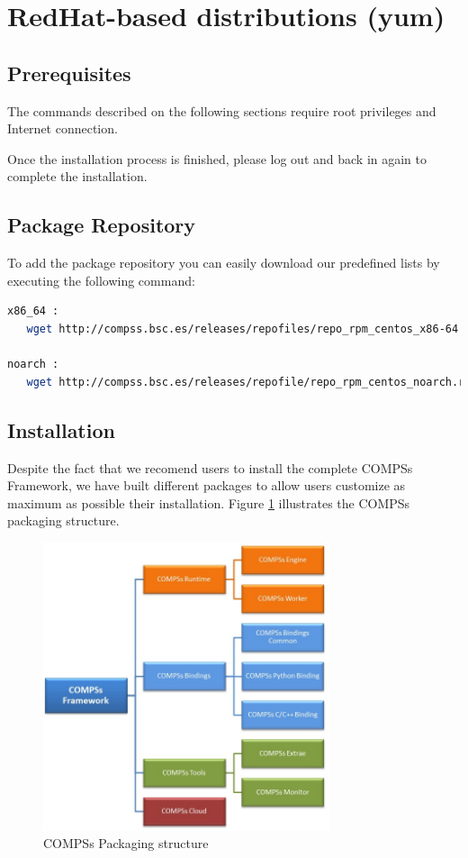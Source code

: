 \section{RedHat-based distributions (yum)}
\label{sec:RedHat_yum}


\subsection{Prerequisites}
The commands described on the following sections require root privileges and Internet connection.

Once the installation process is finished, please log out and back in again to complete the installation. 

\subsection{Package Repository}
To add the package repository you can easily download our predefined lists by executing the following command:
\begin{lstlisting}[language=bash]
x86_64 :  
   wget http://compss.bsc.es/releases/repofiles/repo_rpm_centos_x86-64.repo -O /etc/yum.repos.d/compss-framework_x86-64.repo
   
noarch :
   wget http://compss.bsc.es/releases/repofile/repo_rpm_centos_noarch.repo -O /etc/yum.repos.d/compss-framework_noarch.repo
\end{lstlisting}


\subsection{Installation}
Despite the fact that we recomend users to install the complete COMPSs Framework, we have built different packages to allow users
customize as maximum as possible their installation. Figure \ref{fig:compss_packages_yum} illustrates the COMPSs packaging structure.
\begin{figure}[ht!]
  \centering
    \includegraphics[width=0.75\textwidth]{./Sections/4_RedHat_yum/Figures/compss_packages.jpeg}
    \caption{COMPSs Packaging structure}
    \label{fig:compss_packages_yum}
\end{figure}


